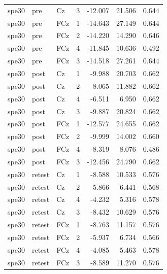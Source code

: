 \documentclass[11pt,a4paper]{article}
\begin{document}
\begin{longtable}{lllrrrr}
spe30 & pre & Cz & 3 & -12.007 & 21.506 & 0.644 \\
spe30 & pre & FCz & 1 & -14.643 & 27.149 & 0.644 \\
spe30 & pre & FCz & 2 & -14.220 & 14.290 & 0.646 \\
spe30 & pre & FCz & 4 & -11.845 & 10.636 & 0.492 \\
spe30 & pre & FCz & 3 & -14.518 & 27.261 & 0.644 \\
spe30 & post & Cz & 1 & -9.988 & 20.703 & 0.662 \\
spe30 & post & Cz & 2 & -8.065 & 11.882 & 0.662 \\
spe30 & post & Cz & 4 & -6.511 & 6.950 & 0.662 \\
spe30 & post & Cz & 3 & -9.887 & 20.824 & 0.662 \\
spe30 & post & FCz & 1 & -12.577 & 24.655 & 0.662 \\
spe30 & post & FCz & 2 & -9.999 & 14.002 & 0.660 \\
spe30 & post & FCz & 4 & -8.319 & 8.076 & 0.486 \\
spe30 & post & FCz & 3 & -12.456 & 24.790 & 0.662 \\
spe30 & retest & Cz & 1 & -8.588 & 10.533 & 0.576 \\
spe30 & retest & Cz & 2 & -5.866 & 6.441 & 0.568 \\
spe30 & retest & Cz & 4 & -4.232 & 5.316 & 0.578 \\
spe30 & retest & Cz & 3 & -8.432 & 10.629 & 0.576 \\
spe30 & retest & FCz & 1 & -8.763 & 11.157 & 0.576 \\
spe30 & retest & FCz & 2 & -5.937 & 6.734 & 0.566 \\
spe30 & retest & FCz & 4 & -4.085 & 5.463 & 0.578 \\
spe30 & retest & FCz & 3 & -8.589 & 11.270 & 0.576 \\
\bottomrule\end{longtable}\normalsize
\end{document}
